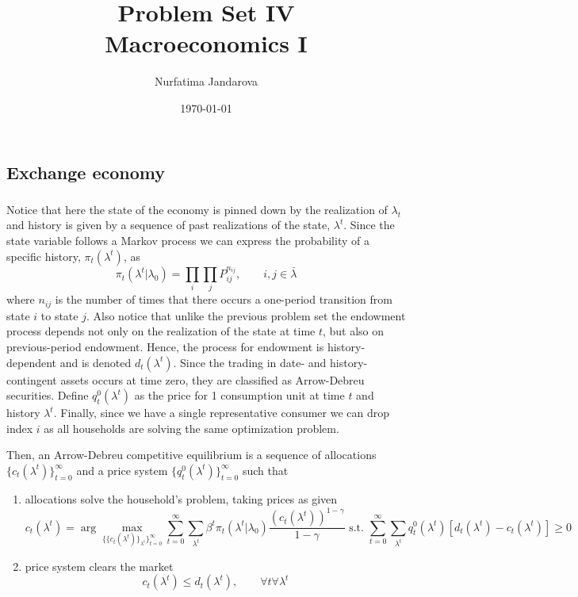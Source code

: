 \documentclass[]{article}
\title{Problem Set IV \\ \large Macroeconomics I}
\author{Nurfatima Jandarova}
\date{\today}
\begin{document}
\maketitle

\subsection{Exchange economy}

\subsubsection{}

Notice that here the state of the economy is pinned down by the realization of $\lambda_t$ and history is given by a sequence of past realizations of the state, $\lambda^t$. Since the state variable follows a Markov process we can express the probability of a specific history, $\pi_t(\lambda^t)$, as
\begin{equation}
	\label{eq:ex1jointp}
	\pi_t(\lambda^t|\lambda_0) = \prod\limits_{i}\prod\limits_{j}P_{ij}^{n_{ij}}, \qquad i, j \in\bar{\lambda}
\end{equation}
where $n_{ij}$ is the number of times that there occurs a one-period transition from state $i$ to state $j$. Also notice that unlike the previous problem set the endowment process depends not only on the realization of the state at time $t$, but also on previous-period endowment. Hence, the process for endowment is history-dependent and is denoted $d_t(\lambda^t)$. Since the trading in date- and history-contingent assets occurs at time zero, they are classified as Arrow-Debreu securities. Define $q_t^0(\lambda^t)$ as the price for 1 consumption unit at time $t$ and history $\lambda^t$. Finally, since we have a single representative consumer we can drop index $i$ as all households are solving the same optimization problem.

Then, an Arrow-Debreu competitive equilibrium is a sequence of allocations $\{c_t(\lambda^t)\}_{t = 0}^\infty$ and a price system $\{q_t^0(\lambda^t)\}_{t = 0}^\infty$ such that
\begin{enumerate}[label = \roman*)]
	\item allocations solve the household's problem, taking prices as given
	\begin{equation}
	c_t(\lambda^t) = \arg\max\limits_{\{\{c_t(\lambda^t)\}_{\lambda^t}\}_{t = 0}^\infty}\sum\limits_{t = 0}^\infty\sum\limits_{\lambda^t}\beta^t\pi_t(\lambda^t|\lambda_0)\frac{(c_t(\lambda^t))^{1-\gamma}}{1 - \gamma}\text{ s.t. }\sum\limits_{t = 0}^\infty\sum\limits_{\lambda^t}q_t^0(\lambda^t)[d_t(\lambda^t) - c_t(\lambda^t)]\geq 0 \nonumber
	\end{equation}
	\item price system clears the market
	\begin{equation}
	c_t(\lambda^t) \leq d_t(\lambda^t), \qquad\forall t \forall \lambda^t \nonumber
	\end{equation}
\end{enumerate}
\end{document}
